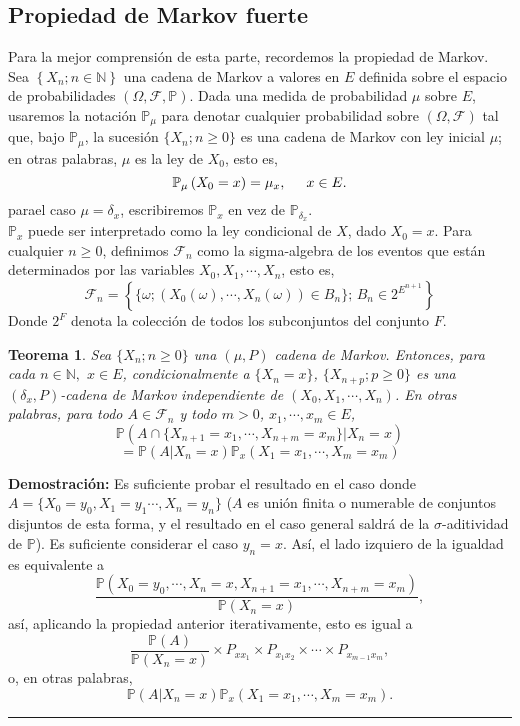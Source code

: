 \documentclass[a4paper]{article}
\newcommand{\prob}{\mathbb{P}}
\newtheorem{teorema}{Teorema}
\numberwithin{equation}{subsection}
\def\N{\mathbb N}
\begin{document}
\subsection{Propiedad de Markov fuerte}
Para la mejor comprensión de esta parte, recordemos la propiedad de Markov. Sea $\left\{X_n;n\in \N\right\}$ una cadena de Markov a valores en $E$ definida sobre el espacio de probabilidades $\left(\Omega,\mathcal{F},\prob\right)$. Dada una medida de probabilidad $\mu$ sobre $E$, usaremos la notación $\prob_{\mu}$ para denotar cualquier probabilidad sobre $\left(\Omega,\mathcal{F}\right)$ tal que, bajo $\prob_{\mu}$, la sucesión $\{X_n; n\geq 0\}$ es una cadena de Markov con ley inicial $\mu$; en otras palabras, $\mu$ es la ley de $X_0$, esto es,
\[\prob_{\mu}\left(X_0=x\right) = \mu_x, \hspace{0.5cm}x\in E.\]
parael caso $\mu = \delta_x$, escribiremos $\prob_x$ en vez de $\prob_{\delta_x}$.\\ $\prob_x$ puede ser interpretado como la ley condicional de $X$, dado $X_0=x$. Para cualquier $n\geq 0$, definimos $\mathcal{F}_n$ como la sigma-algebra de los eventos que están determinados por las variables $X_0,X_1,\cdots,X_n$, esto es,
\[\mathcal{F}_n = \left\{\{\omega; \left(X_0(\omega),\cdots,X_n(\omega)\right)\in B_n\};\,B_n \in 2^{E^{n+1}}\right\}\]
Donde $2^F$ denota la colección de todos los subconjuntos del conjunto $F$.

\begin{teorema}
Sea $\{X_n; n\geq 0\}$ una $(\mu,P)$ cadena de Markov. Entonces, para cada $n\in \N,$ $x\in E$, condicionalmente a $\{X_n=x\}$, $\{X_{n+p}; p\geq 0\}$ es una $(\delta_x,P)$-cadena de Markov independiente  de $\left(X_0,X_1,\cdots,X_n\right)$. En otras palabras, para todo $A \in \mathcal{F}_n$ y todo $m>0$, $x_1,\cdots,x_m \in E$,
\[\prob\left(A\cap\{X_{n+1}=x_1,\cdots,X_{n+m} = x_m\}|X_n=x\right)\]
\[= \prob\left(A|X_n=x\right)\prob_x\left(X_1 = x_1,\cdots,X_m = x_m\right)\]
\end{teorema}
\textbf{Demostración: }Es suficiente probar el resultado en el caso donde $A=\{X_0=y_0,X_1=y_1\cdots,X_n=y_n\}$ ($A$ es unión finita o numerable de conjuntos disjuntos de esta forma, y el resultado en el caso general saldrá de la $\sigma$-aditividad de $\prob$). Es suficiente considerar el caso $y_n =x$. Así, el lado izquiero de la igualdad es equivalente a
\[\frac{\prob\left(X_0=y_0,\cdots,X_n=x,X_{n+1}=x_1,\cdots,X_{n+m}=x_m\right)}{\prob\left(X_n=x\right)},\]
así, aplicando la propiedad anterior iterativamente, esto es igual a
\[\frac{\prob(A)}{\prob\left(X_n=x\right)}\times P_{xx_1}\times P_{x_1x_2}\times \cdots \times P_{x_{m-1}x_m},\]
o, en otras palabras,
\[\prob\left(A|X_n=x\right)\prob_x\left(X_1=x_1,\cdots,X_m=x_m\right).\]
\rule{0.7em}{0.7em}\\ \newline
\end{document}
